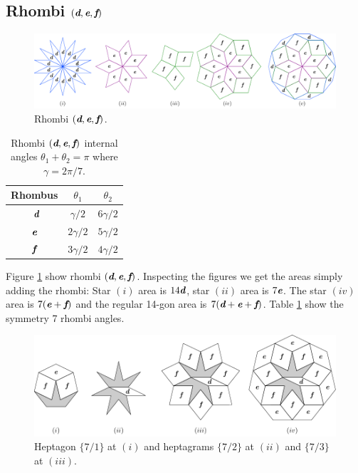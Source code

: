 \documentclass[11pt]{article}
\def\mathbi#1{\textbf{\em #1}}
\begin{document}
\subsection{Rhombi $(\mathbi{d},\mathbi{e},\mathbi{f})$}

\begin{figure}[H]
\centering
\includegraphics[scale=0.9]{def/rhombi}
\caption{Rhombi $(\mathbi{d},\mathbi{e},\mathbi{f})$.}
\label{fig:def-rhombi}
\end{figure}

\begin{table}[H]
\begin{center}
\begin{tabular}{|c|c c|}
\hline
Rhombus & $\theta_1$ & $\theta_2$ \\ %
\hline\
$\mathbi{d}$ & $\gamma/2$ & $6\gamma/2$ \\[0.5ex] \hline
$\mathbi{e}$ & $2\gamma/2$ & $5\gamma/2$ \\[0.5ex] \hline
$\mathbi{f}$ & $3\gamma/2$ & $4\gamma/2$ \\[0.5ex] \hline
\end{tabular}
\caption{Rhombi $(\mathbi{d},\mathbi{e},\mathbi{f})$ internal angles $\theta_1 + \theta_2 = \pi$ where $\gamma = 2\pi/7$.} 
\label{tbl:def-angles}
\end{center}
\end{table}

Figure \ref{fig:def-rhombi} show rhombi $(\mathbi{d},\mathbi{e},\mathbi{f})$. 
Inspecting the figures we get the areas simply adding the rhombi:
Star $(i)$ area is $14\mathbi{d}$, star $(ii)$ area is $7\mathbi{e}$. The star $(iv)$ area is $7(\mathbi{e} + \mathbi{f})$ and the regular 14-gon area is $7(\mathbi{d} + \mathbi{e} + \mathbi{f})$. Table \ref {tbl:def-angles} show the symmetry 7 rhombi angles.


\begin{figure}[H]
\centering
\includegraphics[scale=1.1]{def/hepta}
\caption{Heptagon $\{7/1\}$ at $(i)$ and heptagrams $\{7/2\}$ at $(ii)$ and $\{7/3\}$ at $(iii)$.}
\label{fig:def-hepta}
\end{figure}
\end{document}
